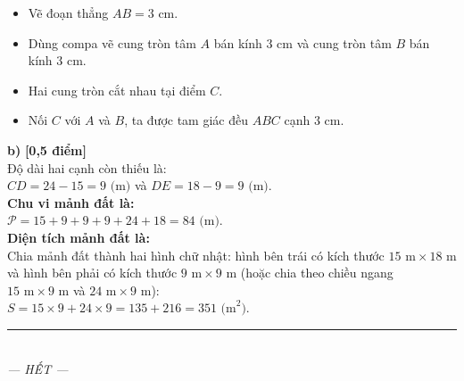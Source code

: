 \documentclass[12pt,a4paper]{article}
\begin{document}
\begin{ex}
{\begin{itemize}[leftmargin=1.5cm, topsep=1pt, itemsep=1pt]
  \item Vẽ đoạn thẳng $AB = 3\text{ cm}$.
  \item Dùng compa vẽ cung tròn tâm $A$ bán kính $3\text{ cm}$ và cung tròn tâm $B$ bán kính $3\text{ cm}$.
  \item Hai cung tròn cắt nhau tại điểm $C$.
  \item Nối $C$ với $A$ và $B$, ta được tam giác đều $ABC$ cạnh $3\text{ cm}$.
\end{itemize}
\begin{center}
\end{center}

\textbf{b)} \textbf{[0,5 điểm]}\\ Độ dài hai cạnh còn thiếu là:\\$CD = 24 - 15 = 9\text{ (m)}$ và $DE = 18 - 9 = 9\text{ (m)}$.\\\textbf{Chu vi mảnh đất là:}\\$\mathcal{P} = 15 + 9 + 9 + 9 + 24 + 18 = 84\text{ (m)}$.\\\textbf{Diện tích mảnh đất là:}\\Chia mảnh đất thành hai hình chữ nhật: hình bên trái có kích thước $15\text{ m} \times 18\text{ m}$ và hình bên phải có kích thước $9\text{ m} \times 9\text{ m}$ (hoặc chia theo chiều ngang $15\text{ m} \times 9\text{ m}$ và $24\text{ m} \times 9\text{ m}$):\\$S = 15 \times 9 + 24 \times 9 = 135 + 216 = 351\text{ (m}^2\text{)}$.


}
\end{ex}
\vspace{2mm}


\begin{center}
\rule{4cm}{0.4pt}\\
\textit{--- HẾT ---}
\end{center}
\end{document}
